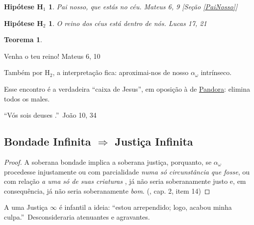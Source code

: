 \documentclass[12pt,a4paper]{article}
\begin{document}
			\newtheorem{H1}{Hip\'otese H$_1$}
			\begin{H1} Pai nosso, que est\'as no c\'eu. Mateus 6, 9 [Se\c{c}\~ao \ref{PaiNosso}]
			\end{H1}

			\newtheorem{H2}{Hip\'otese H$_2$}
			\begin{H2} O reino dos c\'eus est\'a dentro de n\'os. Lucas 17, 21 \cite{perfeicao}
			\end{H2}

			\newtheorem{T}{Teorema}
			\begin{T}
			\end{T}

			Venha o teu reino! Mateus 6, 10

			Tamb\'em por H$_2$, a interpreta\c{c}\~ao fica: aproximai-nos de nosso $ \alpha_\omega $ intr\'inseco\cite{Freud}.

			Esse encontro \'e a verdadeira \textquotedblleft caixa de Jesus\textquotedblright, em oposi\c{c}\~ao \`a de \href{http://en.wikipedia.org/wiki/Pandora\%27s\_box}{Pandora}: elimina todos os males.

			\textquotedblleft V\'os sois deuses \cite{perfeicao}.\textquotedblright\, Jo\~ao 10, 34

			\begin{center}
			\end{center}

		\subsection{Bondade Infinita $ \Rightarrow $ Justi\c{c}a Infinita}
			\begin{flushright}
			\end{flushright}

			\begin{proof}
				A soberana bondade implica a soberana justi\c{c}a, porquanto, se $ \alpha_\omega $ procedesse injustamente ou com parcialidade \emph{numa s\'o circunst\^ancia que fosse}, ou com rela\c{c}\~ao \emph{a uma s\'o de suas criaturas} \cite{criatura}, j\'a n\~ao seria soberanamente justo e, em consequ\^encia, j\'a n\~ao seria soberanamente \emph{bom}. (\cite{genese}, cap. 2, item 14)
			\end{proof}

			A uma Justi\c{c}a $ \infty $ \'e infantil a ideia: \textquotedblleft estou arrependido; logo, acabou minha culpa.\textquotedblright\, Desconsideraria atenuantes e agravantes.
\end{document}
